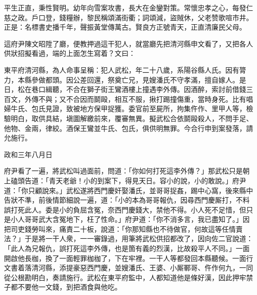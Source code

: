 \begin{myquote}
平生正直，秉性賢明。幼年向雪案攻書，長大在金鑾對策。常懷忠孝之心，每發仁慈之政。戶口登，錢糧辦，黎民稱頌滿街衢；詞頌減，盜賊休，父老赞歌喧市井。正是：名標書史播千年，聲振黃堂傳萬古。賢良方正號青天，正直清廉民父母。
\end{myquote}

這府尹陳文昭陞了廳，便教押過這干犯人，就當廳先把清河縣申文看了，又把各人供狀招擬看過，端的上面怎生寫着？文曰：

\begin{myquote}[\markfont]
東平府清河縣，為人命事呈稱：犯人武松，年二十八歲，系陽谷縣人氏。因有膂力，本縣參做都頭。因公差回還，祭奠亡兄，見嫂潘氏不守孝滿，擅自嫁人。是日，松在巷口緝聽，不合在獅子街王鸞酒樓上撞遇李外傳。因酒醉，索討前借錢三百文，{}外傳不與；又不合因而鬬毆，相互不服，揪打踢撞傷重，當時身死。比有唱婦牛氏、包氏見證，致被地方保甲捉獲。委官前至屍所，拘集仵作、里甲人等，檢驗明白，取供具結，塡圖解繳前來，覆審無異。擬武松合依鬬毆殺人，不問手足、他物、金兩，律絞。酒保王鸞並牛氏、包氏，俱供明無罪。今合行申到案發落，請允施行。

政和三年八月日


\end{myquote}

府尹看了一遍，將武松叫過面前，問道：「你如何打死這李外傳？」那武松只是朝上磕頭告道：「青天老爺！小的到案下，得見天日。容小的說，小的敢說。」府尹道：「你只顧說來。」武松遂將西門慶奸娶潘氏，並哥哥捉姦，踢中心窩，後來縣中告狀不準，前後情節細說一遍，道：「小的本為哥哥報仇，因尋西門慶厮打，不料誤打死此人。委是小的負屈含冤，奈西門慶錢大，禁他不得。小人死不足惜，但只是小人哥哥武大含冤地下，枉了性命。」府尹道：「你不消多言，我已盡知了。」因把司吏錢勞叫來，痛責二十板，說道：「你那知縣也不待做官，何故這等任情賣法？」于是將一干人衆，一一審錄過，用筆將武松供招都改了，因向佐二官說道：「此人為兄報仇，誤打死這李外傳，也是箇有義的烈漢，比故殺平人不同。」一面開啟他長枷，換了一面輕罪枷枷了，下在牢裡。一干人等都發回本縣聽候。一面行文書着落清河縣，添提豪惡西門慶，並嫂潘氏、王婆、小厮鄆哥、仵作何九，一同從公根勘明白，奏請施行。武松在東平府監中，人都知道他是條好漢，因此押牢禁子都不要他一文錢，到把酒食與他吃。

